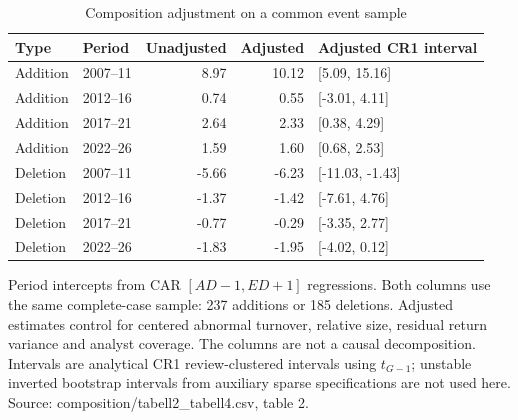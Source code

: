 \begin{table}[!htbp]
\centering
\caption{Composition adjustment on a common event sample}\label{tab:composition}
\small
\setlength{\tabcolsep}{5pt}
\begin{tabular}{llrrl}
\toprule
Type & Period & Unadjusted & Adjusted & Adjusted CR1 interval \\
\midrule
Addition & 2007--11 & 8.97 & 10.12 & [5.09, 15.16] \\
Addition & 2012--16 & 0.74 & 0.55 & [-3.01, 4.11] \\
Addition & 2017--21 & 2.64 & 2.33 & [0.38, 4.29] \\
Addition & 2022--26 & 1.59 & 1.60 & [0.68, 2.53] \\
Deletion & 2007--11 & -5.66 & -6.23 & [-11.03, -1.43] \\
Deletion & 2012--16 & -1.37 & -1.42 & [-7.61, 4.76] \\
Deletion & 2017--21 & -0.77 & -0.29 & [-3.35, 2.77] \\
Deletion & 2022--26 & -1.83 & -1.95 & [-4.02, 0.12] \\
\bottomrule
\end{tabular}
\begin{minipage}{\linewidth}\footnotesize\vspace{5pt}
Period intercepts from CAR $[AD-1,ED+1]$ regressions. Both columns use the same complete-case sample: 237 additions or 185 deletions. Adjusted estimates control for centered abnormal turnover, relative size, residual return variance and analyst coverage. The columns are not a causal decomposition. Intervals are analytical CR1 review-clustered intervals using $t_{G-1}$; unstable inverted bootstrap intervals from auxiliary sparse specifications are not used here. Source: composition/tabell2\_tabell4.csv, table 2.
\end{minipage}
\end{table}
